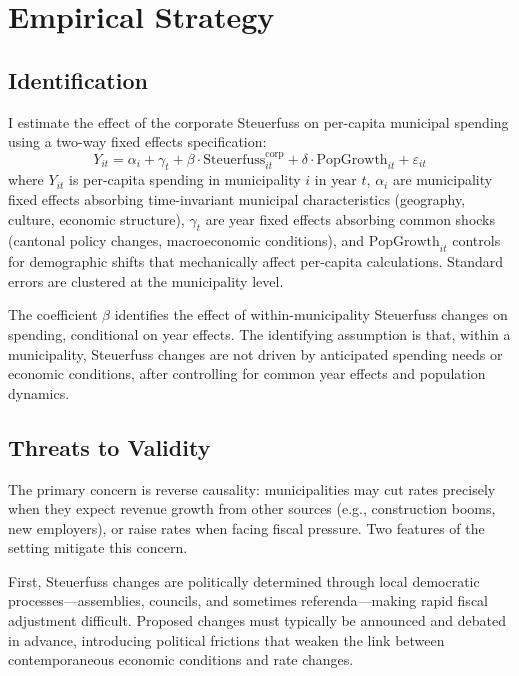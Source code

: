 \documentclass[12pt]{article}
\begin{document}
\section{Empirical Strategy}
\label{sec:strategy}

\subsection{Identification}

I estimate the effect of the corporate Steuerfuss on per-capita municipal spending using a two-way fixed effects specification:
\begin{equation}
Y_{it} = \alpha_i + \gamma_t + \beta \cdot \text{Steuerfuss}_{it}^{\text{corp}} + \delta \cdot \text{PopGrowth}_{it} + \varepsilon_{it}
\label{eq:main}
\end{equation}
where $Y_{it}$ is per-capita spending in municipality $i$ in year $t$, $\alpha_i$ are municipality fixed effects absorbing time-invariant municipal characteristics (geography, culture, economic structure), $\gamma_t$ are year fixed effects absorbing common shocks (cantonal policy changes, macroeconomic conditions), and $\text{PopGrowth}_{it}$ controls for demographic shifts that mechanically affect per-capita calculations. Standard errors are clustered at the municipality level.

The coefficient $\beta$ identifies the effect of within-municipality Steuerfuss changes on spending, conditional on year effects. The identifying assumption is that, within a municipality, Steuerfuss changes are not driven by anticipated spending needs or economic conditions, after controlling for common year effects and population dynamics.

\subsection{Threats to Validity}

The primary concern is reverse causality: municipalities may cut rates precisely when they expect revenue growth from other sources (e.g., construction booms, new employers), or raise rates when facing fiscal pressure. Two features of the setting mitigate this concern.

First, Steuerfuss changes are politically determined through local democratic processes---assemblies, councils, and sometimes referenda---making rapid fiscal adjustment difficult. Proposed changes must typically be announced and debated in advance, introducing political frictions that weaken the link between contemporaneous economic conditions and rate changes.
\end{document}
